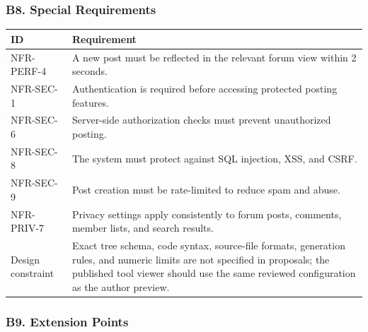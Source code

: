 \documentclass[12pt]{article}
\renewcommand{\baselinestretch}{1.5}
\begin{document}
\hypertarget{sec:b8-special-requirements}{}
\subsubsection*{B8. Special Requirements}
\par\medskip

\begingroup
\small
\renewcommand{\baselinestretch}{1.0}\selectfont
\renewcommand{\arraystretch}{1.15}
\setlength{\tabcolsep}{6pt}
\begin{longtable}{|>{\raggedright\arraybackslash}p{}|>{\raggedright\arraybackslash}p{}|}
\hline
\textbf{ID} & \textbf{Requirement} \\ \hline
\endhead
NFR-PERF-4 & A new post must be reflected in the relevant forum view within 2 seconds. \\ \hline
NFR-SEC-1 & Authentication is required before accessing protected posting features. \\ \hline
NFR-SEC-6 & Server-side authorization checks must prevent unauthorized posting. \\ \hline
NFR-SEC-8 & The system must protect against SQL injection, XSS, and CSRF. \\ \hline
NFR-SEC-9 & Post creation must be rate-limited to reduce spam and abuse. \\ \hline
NFR-PRIV-7 & Privacy settings apply consistently to forum posts, comments, member lists, and search results. \\ \hline
Design constraint & Exact tree schema, code syntax, source-file formats, generation rules, and numeric limits are not specified in proposals; the published tool viewer should use the same reviewed configuration as the author preview. \\ \hline
\end{longtable}
\endgroup
\par\medskip

\hypertarget{sec:b9-extension-points}{}
\subsubsection*{B9. Extension Points}
\par\medskip
\end{document}
